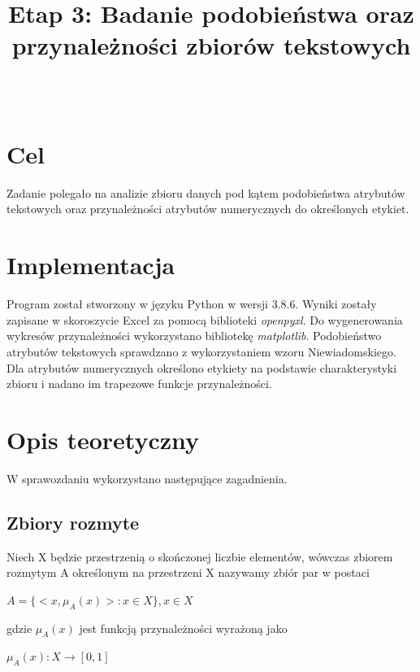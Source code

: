 \documentclass{classrep}
\author{%
  \studentinfo{Paweł Galewicz}{234053}\\
  \studentinfo{Karol Podlewski}{234106}%
}
\title{Etap 3: Badanie podobieństwa oraz przynależności zbiorów tekstowych}
\begin{document}
\maketitle


\tableofcontents
{}
\newpage


\section{Cel}

Zadanie polegało na analizie zbioru danych pod kątem podobieństwa atrybutów tekstowych oraz przynależności atrybutów numerycznych do określonych etykiet.

\section{Implementacja}

Program został stworzony w języku Python w wersji 3.8.6. Wyniki zostały zapisane w skoroszycie Excel za pomocą biblioteki \textit{openpyxl}. Do wygenerowania wykresów przynależności wykorzystano bibliotekę \textit{matplotlib}. Podobieństwo atrybutów tekstowych sprawdzano z wykorzystaniem wzoru Niewiadomskiego. Dla atrybutów numerycznych określono etykiety na podstawie charakterystyki zbioru i nadano im trapezowe funkcje przynależności.

\section{Opis teoretyczny}

W sprawozdaniu wykorzystano następujące zagadnienia.


\subsection{Zbiory rozmyte}

Niech X będzie przestrzenią o skończonej liczbie elementów, wówczas zbiorem
rozmytym A określonym na przestrzeni X nazywamy zbiór par w postaci

\begin{center}
    $A = \{< x, \mu_A(x) >: x \in X\}, x \in X$
\end{center}

gdzie $\mu_A(x)$ jest funkcją przynależności wyrażoną jako

\begin{center}
    $\mu_A(x): X \rightarrow [0,1]$    
\end{center}
\end{document}
